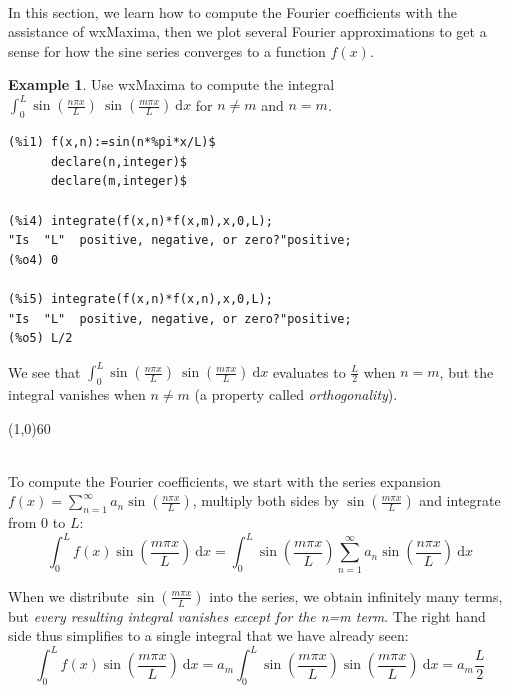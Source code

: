 \documentclass[10.5pt,twoside]{report}
\theoremstyle{definition}
\newtheorem{exmp}{Example}[section]
\begin{document}
${}$\\
In this section, we learn how to compute the Fourier coefficients with the assistance of wxMaxima, then we plot several Fourier approximations to get a sense for how the sine series converges to a function $f(x)$.  

\begin{exmp} Use wxMaxima to compute the integral $\displaystyle \int_{0}^{L} \sin{\left( \frac{n\pi x}{L}\right) }\ \sin{\left( \frac{m\pi x}{L}\right) }\ \mathrm{d}x$ for $n\neq m$ and $n=m$.

\begin{verbatim}
(%i1) f(x,n):=sin(n*%pi*x/L)$
      declare(n,integer)$
      declare(m,integer)$
      
(%i4) integrate(f(x,n)*f(x,m),x,0,L);
"Is  "L"  positive, negative, or zero?"positive;
(%o4) 0

(%i5) integrate(f(x,n)*f(x,n),x,0,L);
"Is  "L"  positive, negative, or zero?"positive;
(%o5) L/2
\end{verbatim}

We see that $\displaystyle \int_{0}^{L} \sin{\left( \frac{n\pi x}{L}\right) }\ \sin{\left( \frac{m\pi x}{L}\right) }\ \mathrm{d}x$ evaluates to $ \frac{L}{2}$ when $n=m$, but the integral vanishes when $n\neq m$ (a property called \textit{orthogonality}). 

\end{exmp}

\line(1,0){60}
\linethickness{0.5mm}
${}$\\
${}$\\
\pagebreak

To compute the Fourier coefficients, we start with the series expansion $f(x)= \sum_{n=1}^{\infty} a_n \sin{\left( \frac{n\pi x}{L}\right) }$, multiply both sides by $ \sin{\left( \frac{m\pi x}{L}\right) }$ and integrate from $0$ to $L$:\\


\[\int_{0}^{L} f(x) \sin{\left( \frac{m\pi x}{L}\right) }\ \mathrm{d}x= \int_{0}^{L} \sin{\left( \frac{m\pi x}{L}\right) } \sum_{n=1}^{\infty} a_n \sin{\left( \frac{n\pi x}{L}\right) }\ \mathrm{d}x\]

When we distribute $\sin{\left( \frac{m\pi x}{L}\right) }$ into the series, we obtain infinitely many terms, but \textit{every resulting integral vanishes except for the n=m term}.  The right hand side thus simplifies to a single integral that we have already seen:\\

\[\int_{0}^{L} f(x) \sin{\left( \frac{m\pi x}{L}\right) }\ \mathrm{d}x= a_m \int_{0}^{L} \sin{\left( \frac{m\pi x}{L}\right) } \sin{\left( \frac{m\pi x}{L}\right) }\ \mathrm{d}x = a_m\frac{L}{2}\]
\end{document}
